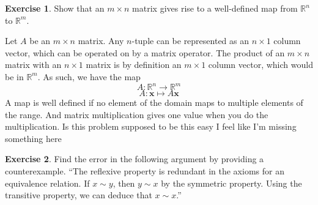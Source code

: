 \documentclass{article}
\theoremstyle{definition}
\newtheorem{environment}{Exercise}
\newenvironment{exercise}
    {\begin{mdframed}\begin{environment}}
    {\end{environment}\end{mdframed}}
\begin{document}
\begin{exercise}
    Show that an \(m\times n\) matrix gives rise to a well-defined map from \(\mathbb{R} ^n\) to \(\mathbb{R} ^m\).
\end{exercise}
Let \(A\) be an \(m\times n\) matrix. Any \(n\)-tuple can be represented as an \(n\times 1\) column vector, which can be operated on by a matrix operator. The product of an \(m\times n\) matrix with an \(n\times 1\) matrix is by definition an \(m\times 1\) column vector, which would be in \(\mathbb{R} ^m\). As such, we have the map
\[
    A:\mathbb{R} ^n \to \mathbb{R} ^m
\]
\[
    A: \mathbf{x}\mapsto A \mathbf{x}
\]
A map is well defined if no element of the domain maps to multiple elements of the range. And matrix multiplication gives one value when you do the multiplication. Is this problem supposed to be this easy I feel like I'm missing something here
\begin{exercise}
    Find the error in the following argument by providing a counterexample. ``The reflexive property is redundant in the axioms for an equivalence relation. If \(x\sim y\), then \(y\sim x\) by the symmetric property. Using the transitive property, we can deduce that \(x\sim x\).''
\end{exercise}
\end{document}

